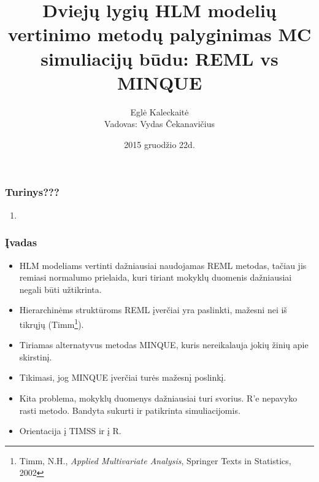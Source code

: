 \documentclass[utf8,hyperref={unicode,pdftex}]{beamer}
\title[\hspace{130pt} p. \insertpagenumber\enspace iš \insertdocumentendpage\enspace ]{Dviejų lygių HLM modelių vertinimo metodų palyginimas MC simuliacijų būdu: REML vs MINQUE}
\author[ E. Kaleckaitė]{Eglė Kaleckaitė\\
Vadovas: Vydas Čekanavičius}
\institute{Vilniaus Universitetas, Matematikos ir Informatikos Fakultetas}
\date{2015 gruodžio 22d.}
\begin{document}
\begin{frame}
\titlepage
\end{frame}
\begin{frame}
\frametitle{Turinys???}
\Large
\begin{enumerate}
\item 
\end{enumerate}
\end{frame}
\begin{frame}
\frametitle{Įvadas}
\begin{itemize}
\item HLM modeliams vertinti dažniausiai naudojamas REML metodas, tačiau jis remiasi normalumo prielaida, kuri tiriant mokyklų duomenis dažniausiai negali būti užtikrinta.
\item Hierarchinėms struktūroms REML įverčiai yra paslinkti, mažesni nei iš tikrųjų (Timm\footnote{Timm, N.H., \textit{Applied Multivariate Analysis}, Springer Texts in Statistics, 2002}).
\item Tiriamas alternatyvus metodas MINQUE, kuris nereikalauja jokių žinių apie skirstinį.
\item Tikimasi, jog MINQUE įverčiai turės mažesnį poslinkį.
\item Kita problema, mokyklų duomenys dažniausiai turi svorius. R'e nepavyko rasti metodo. Bandyta sukurti ir patikrinta simuliacijomis.
\item Orientacija į TIMSS ir į R.
\end{itemize}
\end{frame}
\end{document}
